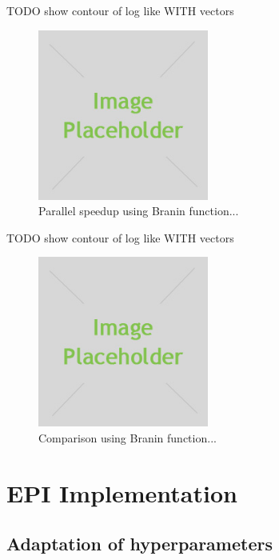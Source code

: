 \documentclass[phd,tocprelim]{cornell}
\begin{document}
TODO
show contour of log like WITH vectors
\begin{figure}[hpt]
 	\centerline{\includegraphics[width=0.5\textwidth]{figures/placeholder.jpg}}
    \caption[Parallel speedup using Branin function]{Parallel speedup using Branin function...}
 	\label{fig:EPI_res5}
\end{figure}

TODO
show contour of log like WITH vectors
\begin{figure}[hpt]
 	\centerline{\includegraphics[width=0.5\textwidth]{figures/placeholder.jpg}}
    \caption[Comparison using Branin function]{Comparison using Branin function...}
 	\label{fig:EPI_res6}
\end{figure}


\chapter{EPI Implementation} %
\label{cha:EPI Implementation}

\section{Adaptation of hyperparameters} %
\label{sec:Adaptation of hyperparameters}
\end{document}
